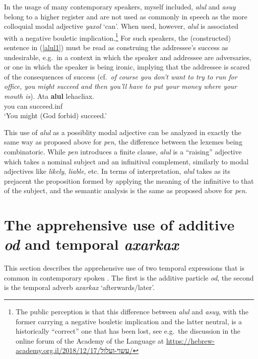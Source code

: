 \documentclass[output=paper,colorlinks,citecolor=brown]{langscibook}
\begin{document}
In the usage of many contemporary speakers, myself included,  \textit{alul} and \textit{asuy} belong to a higher register and are not used as commonly in speech as the more colloquial modal adjective \textit{yaxol} `can'. When used, however, \textit{alul} is associated with a negative bouletic implication.\footnote{The public perception is that this difference between \textit{alul} and \textit{asuy}, with the former carrying a negative bouletic implication and the latter neutral, is a historically ``correct'' one that has been lost, see e.g.\  the discussion in the online forum of the Academy of the  Language at \url{https://hebrew-academy.org.il/2018/12/17/עשוי-ועלול/}} For such speakers, the (constructed) sentence in (\ref{alul1}) must be read as construing the addressee's success as undesirable, e.g.\ in a context in which the speaker and addressee are adversaries, or one in which the speaker is being ironic, implying that the addressee is scared of the consequences of success (cf.\  \textit{of course you don't want to try to run for office, you might succeed and then you'll have to put your money where your mouth is}).  
\ea
\label{alul1}
\gll Ata \textbf{alul} lehacliax. \\
you can succeed.{\sc inf} \\
\glt `You might (God forbid) succeed.'
\z

This use of \textit{alul} as a possiblity modal adjective can be analyzed in exactly the same way as proposed above for \textit{pen}, the difference between the lexemes being combinatoric. While \textit{pen} introduces a finite clause, \textit{alul} is a ``raising'' adjective which takes a nominal subject and an infinitival complement, similarly to  modal adjectives like \textit{likely}, \textit{liable}, etc. In terms of interpretation, \textit{alul} takes as its prejacent the proposition formed by applying the meaning of the infinitive to that of the subject, and the semantic analysis is the same as proposed above for \textit{pen}. 





\section{The apprehensive use of additive \textit{od} and temporal \textit{axarkax}}
\label{sec:appradditivetemporal}
This section describes the apprehensive use of two temporal expressions that is common in contemporary spoken . The first is the additive particle \textit{od}, the second is the temporal adverb \textit{axarkax} `afterwards/later'.
\end{document}
